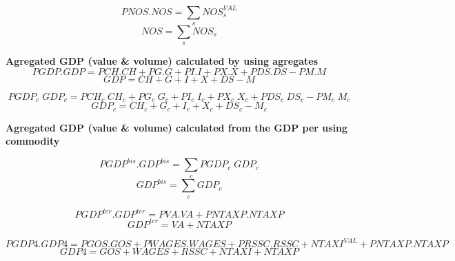 \documentclass[12pt]{article}
\numberwithin{equation}{section}
\begin{document}
\begin{dmath}
PNOS . NOS = \sum_{s} NOS^{VAL}_{s}
\end{dmath}
\begin{dmath}
NOS = \sum_{s} NOS_{s}
\end{dmath}








\textbf{Agregated GDP (value \& volume) calculated by using agregates}
\begin{dmath}
PGDP . GDP = PCH . CH + PG . G + PI . I + PX . X + PDS . DS - PM . M
\end{dmath}
\begin{dmath}
GDP = CH + G + I + X + DS - M
\end{dmath}



\begin{dmath}
PGDP_{c} \; GDP_{c} = PCH_{c} \; CH_{c} + PG_{c} \; G_{c} + PI_{c} \; I_{c} + PX_{c} \; X_{c} + PDS_{c} \; DS_{c} - PM_{c} \; M_{c}
\end{dmath}
\begin{dmath}
GDP_{c} = CH_{c} + G_{c} + I_{c} + X_{c} + DS_{c} - M_{c}
\end{dmath}

\textbf{Agregated GDP (value \& volume) calculated from the GDP per using commodity}

\begin{dmath}
PGDP^{bis} . GDP^{bis} = \sum_{c} PGDP_{c} \; GDP_{c}
\end{dmath}
\begin{dmath}
GDP^{bis} = \sum_{c} GDP_{c}
\end{dmath}



\begin{dmath}
PGDP^{ter} . GDP^{ter} = PVA . VA + PNTAXP . NTAXP
\end{dmath}
\begin{dmath}
GDP^{ter} = VA + NTAXP
\end{dmath}




\begin{dmath}
PGDP4 . GDP4 = PGOS . GOS + PWAGES . WAGES + PRSSC . RSSC + NTAXI^{VAL} + PNTAXP . NTAXP
\end{dmath}
\begin{dmath}
GDP4 = GOS + WAGES + RSSC + NTAXI + NTAXP
\end{dmath}
\end{document}
